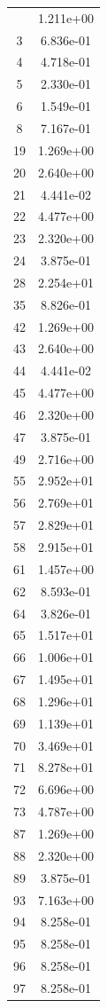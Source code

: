 \documentclass[12pt]{article}
\begin{document}
\begin{longtable}{@{}cc@{}}
\bottomrule
\endlastfoot
1 & 1.211e+00 \\
3 & 6.836e-01 \\
4 & 4.718e-01 \\
5 & 2.330e-01 \\
6 & 1.549e-01 \\
8 & 7.167e-01 \\
19 & 1.269e+00 \\
20 & 2.640e+00 \\
21 & 4.441e-02 \\
22 & 4.477e+00 \\
23 & 2.320e+00 \\
24 & 3.875e-01 \\
28 & 2.254e+01 \\
35 & 8.826e-01 \\
42 & 1.269e+00 \\
43 & 2.640e+00 \\
44 & 4.441e-02 \\
45 & 4.477e+00 \\
46 & 2.320e+00 \\
47 & 3.875e-01 \\
49 & 2.716e+00 \\
55 & 2.952e+01 \\
56 & 2.769e+01 \\
57 & 2.829e+01 \\
58 & 2.915e+01 \\
61 & 1.457e+00 \\
62 & 8.593e-01 \\
64 & 3.826e-01 \\
65 & 1.517e+01 \\
66 & 1.006e+01 \\
67 & 1.495e+01 \\
68 & 1.296e+01 \\
69 & 1.139e+01 \\
70 & 3.469e+01 \\
71 & 8.278e+01 \\
72 & 6.696e+00 \\
73 & 4.787e+00 \\
87 & 1.269e+00 \\
88 & 2.320e+00 \\
89 & 3.875e-01 \\
93 & 7.163e+00 \\
94 & 8.258e-01 \\
95 & 8.258e-01 \\
96 & 8.258e-01 \\
97 & 8.258e-01 \\

\end{longtable}
\end{document}

